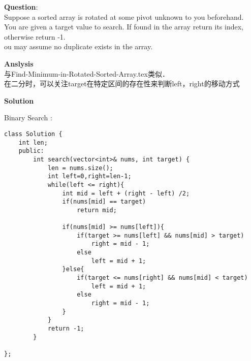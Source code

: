 \begin{description}
    \item{\textbf{Question}}:\\%
		Suppose a sorted array is rotated at some pivot unknown to you beforehand.\\
		You are given a target value to search. If found in the array return its index, otherwise return -1.\\
		ou may assume no duplicate exists in the array.\\
    \item{\textbf{Anslysis}}\\
		与Find-Minimum-in-Rotated-Sorted-Array.tex类似．\\
		在二分时，可以关注target在特定区间的存在性来判断left，right的移动方式\\
    \item{\textbf{Solution}}\\
	\item{Binary Search} : \\
		\begin{lstlisting}
class Solution {
	int len;
	public:
		int search(vector<int>& nums, int target) {
			len = nums.size();
			int left=0,right=len-1;
			while(left <= right){
				int mid = left + (right - left) /2;
				if(nums[mid] == target)
					return mid;

				if(nums[mid] >= nums[left]){
					if(target >= nums[left] && nums[mid] > target)
						right = mid - 1;
					else
						left = mid + 1;
				}else{
					if(target <= nums[right] && nums[mid] < target)
						left = mid + 1;
					else
						right = mid - 1;
				}
			}
			return -1;
		}

};
		\end{lstlisting}
\end{description}

